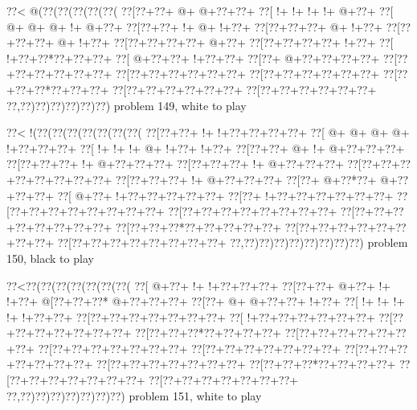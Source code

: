 \vbox{\vbox{\goo
\0??<\- @(\0??(\0??(\0??(\0??(\0??(
\0??[\0??+\0??+\- @+\- @+\0??+\0??+
\0??[\- !+\- !+\- !+\- !+\- @+\0??+
\0??[\- @+\- @+\- @+\- !+\- @+\0??+
\0??[\0??+\0??+\- !+\- @+\- !+\0??+
\0??[\0??+\0??+\0??+\- @+\- !+\0??+
\0??[\0??+\0??+\0??+\- @+\- !+\0??+
\0??[\0??+\0??+\0??+\0??+\- @+\0??+
\0??[\0??+\0??+\0??+\0??+\- !+\0??+
\0??[\- !+\0??+\0??*\0??+\0??+\0??+
\0??[\- @+\0??+\0??+\- !+\0??+\0??+
\0??[\0??+\- @+\0??+\0??+\0??+\0??+
\0??[\0??+\0??+\0??+\0??+\0??+\0??+
\0??[\0??+\0??+\0??+\0??+\0??+\0??+
\0??[\0??+\0??+\0??+\0??+\0??+\0??+
\0??[\0??+\0??+\0??*\0??+\0??+\0??+
\0??[\0??+\0??+\0??+\0??+\0??+\0??+
\0??[\0??+\0??+\0??+\0??+\0??+\0??+
\0??,\0??)\0??)\0??)\0??)\0??)\0??)
}
\hfil problem 149, white to play\hfil\break
}

\vbox{\vbox{\goo
\0??<\- !(\0??(\0??(\0??(\0??(\0??(\0??(\0??(
\0??[\0??+\0??+\- !+\- !+\0??+\0??+\0??+\0??+
\0??[\- @+\- @+\- @+\- @+\- !+\0??+\0??+\0??+
\0??[\- !+\- !+\- !+\- @+\- !+\0??+\- !+\0??+
\0??[\0??+\0??+\- @+\- !+\- @+\0??+\0??+\0??+
\0??[\0??+\0??+\0??+\- !+\- @+\0??+\0??+\0??+
\0??[\0??+\0??+\0??+\- !+\- @+\0??+\0??+\0??+
\0??[\0??+\0??+\0??+\0??+\0??+\0??+\0??+\0??+
\0??[\0??+\0??+\0??+\- !+\- @+\0??+\0??+\0??+
\0??[\0??+\- @+\0??*\0??+\- @+\0??+\0??+\0??+
\0??[\- @+\0??+\- !+\0??+\0??+\0??+\0??+\0??+
\0??[\0??+\- !+\0??+\0??+\0??+\0??+\0??+\0??+
\0??[\0??+\0??+\0??+\0??+\0??+\0??+\0??+\0??+
\0??[\0??+\0??+\0??+\0??+\0??+\0??+\0??+\0??+
\0??[\0??+\0??+\0??+\0??+\0??+\0??+\0??+\0??+
\0??[\0??+\0??+\0??*\0??+\0??+\0??+\0??+\0??+
\0??[\0??+\0??+\0??+\0??+\0??+\0??+\0??+\0??+
\0??[\0??+\0??+\0??+\0??+\0??+\0??+\0??+\0??+
\0??,\0??)\0??)\0??)\0??)\0??)\0??)\0??)\0??)
}
\hfil problem 150, black to play\hfil\break
}

\vbox{\vbox{\goo
\0??<\0??(\0??(\0??(\0??(\0??(\0??(\0??(
\0??[\- @+\0??+\- !+\- !+\0??+\0??+\0??+
\0??[\0??+\0??+\- @+\0??+\- !+\- !+\0??+
\- @[\0??+\0??+\0??*\- @+\0??+\0??+\0??+
\0??[\0??+\- @+\- @+\0??+\0??+\- !+\0??+
\0??[\- !+\- !+\- !+\- !+\- !+\0??+\0??+
\0??[\0??+\0??+\0??+\0??+\0??+\0??+\0??+
\0??[\- !+\0??+\0??+\0??+\0??+\0??+\0??+
\0??[\0??+\0??+\0??+\0??+\0??+\0??+\0??+
\0??[\0??+\0??+\0??*\0??+\0??+\0??+\0??+
\0??[\0??+\0??+\0??+\0??+\0??+\0??+\0??+
\0??[\0??+\0??+\0??+\0??+\0??+\0??+\0??+
\0??[\0??+\0??+\0??+\0??+\0??+\0??+\0??+
\0??[\0??+\0??+\0??+\0??+\0??+\0??+\0??+
\0??[\0??+\0??+\0??+\0??+\0??+\0??+\0??+
\0??[\0??+\0??+\0??*\0??+\0??+\0??+\0??+
\0??[\0??+\0??+\0??+\0??+\0??+\0??+\0??+
\0??[\0??+\0??+\0??+\0??+\0??+\0??+\0??+
\0??,\0??)\0??)\0??)\0??)\0??)\0??)\0??)
}
\hfil problem 151, white to play\hfil\break
}

